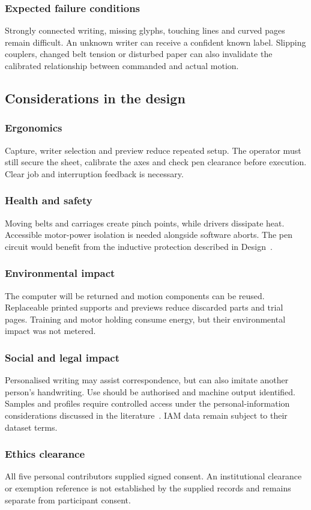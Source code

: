 \subsubsection{Expected failure conditions}
\label{sec:dis-failures}
Strongly connected writing, missing glyphs, touching lines and curved pages remain difficult. An unknown writer can receive a confident known label. Slipping couplers, changed belt tension or disturbed paper can also invalidate the calibrated relationship between commanded and actual motion.

\subsection{Considerations in the design}
\label{sec:dis-considerations}
\subsubsection{Ergonomics}
Capture, writer selection and preview reduce repeated setup. The operator must still secure the sheet, calibrate the axes and check pen clearance before execution. Clear job and interruption feedback is necessary.

\subsubsection{Health and safety}
Moving belts and carriages create pinch points, while drivers dissipate heat. Accessible motor-power isolation is needed alongside software aborts. The pen circuit would benefit from the inductive protection described in Design~\cite{rohmlowside2026}.

\subsubsection{Environmental impact}
The computer will be returned and motion components can be reused. Replaceable printed supports and previews reduce discarded parts and trial pages. Training and motor holding consume energy, but their environmental impact was not metered.

\subsubsection{Social and legal impact}
Personalised writing may assist correspondence, but can also imitate another person's handwriting. Use should be authorised and machine output identified. Samples and profiles require controlled access under the personal-information considerations discussed in the literature~\cite[pp.~8--9, 11]{popia2013}. IAM data remain subject to their dataset terms.

\subsubsection{Ethics clearance}
All five personal contributors supplied signed consent. An institutional clearance or exemption reference is not established by the supplied records and remains separate from participant consent.
\FloatBarrier

